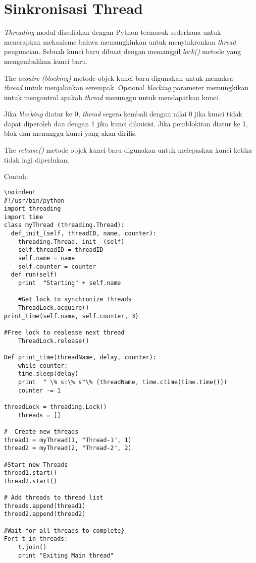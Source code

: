 \documentclass [12pt,a4paper,notitlepage,oneside,bahasa]{article}
\begin{document}
\section{Sinkronisasi Thread}
\textit{Threading} modul disediakan dengan Python termasuk sederhana untuk menerapkan mekanisme bahwa memungkinkan untuk menyinkronkan \textit{thread}\textit{ }penguncian. Sebuah kunci baru dibuat dengan memanggil \textit{lock() }metode yang mengembalikan kunci baru. \par
The \textit{acquire}\textit{ }\textit{(blocking)}\textit{ }metode objek kunci baru digunakan untuk memaksa \textit{thread}\textit{ }untuk menjalankan serempak. Opsional \textit{blocking} parameter memungkikan untuk mengontrol apakah\textit{ thread} menunggu untuk mendapatkan kunci. \par
Jika \textit{blocking} diatur ke 0, \textit{thread} segera kembali dengan nilai 0 jika kunci tidak dapat diperoleh dan dengan 1 jika kunci dikuisisi. Jika pemblokiran diatur ke 1, blok dan menunggu kunci yang akan dirilis. \par
The \textit{release()} metode objek kunci baru digunakan untuk melepaskan kunci ketika tidak lagi diperlukan.  \par
\noindent 
Contoh:
\begin{verbatim}
\noindent 
#!/usr/bin/python
import threading
import time
class myThread (threading.Thread):
  def_init_(self, threadID, name, counter):
	threading.Thread._init_ (self)
	self.threadID = threadID
	self.name = name
	self.counter = counter
  def run(self)
 	print  "Starting" + self.name

 	#Get lock to synchronize threads
	ThreadLock.acquire()
print_time(self.name, self.counter, 3)

#Free lock to realease next thread
	ThreadLock.release()
 
Def print_time(threadName, delay, counter):
	while counter:
	time.sleep(delay)
	print  " \% s:\% s"\% (threadName, time.ctime(time.time()))
	counter -= 1
	
threadLock = threading.Lock()
	threads = []

#  Create new threads
thread1 = myThread(1, "Thread-1", 1)
thread2 = myThread(2, "Thread-2", 2)

#Start new Threads
thread1.start()
thread2.start()

# Add threads to thread list
threads.append(thread1)
thread2.append(thread2)

#Wait for all threads to complete}
Fort t in threads:
	t.join()
	print "Exiting Main thread"
\end{verbatim}
\end{document}
